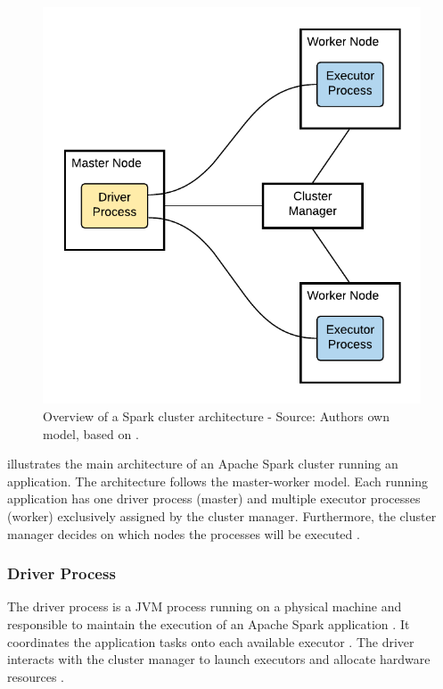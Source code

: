 \begin{figure}[h]
\centering
\includegraphics[scale=1]{images/04_technical_background/spark/spark_cluster_architecture}
\caption{Overview of a Spark cluster architecture - Source: Authors own model, based on \cite{Apache2020Spark}.}
\label{fig:spark_cluster_overview}
\end{figure}

 illustrates the main architecture of an Apache Spark cluster running an application.
The architecture follows the master-worker model.
Each running application has one driver process (master) and multiple executor processes (worker) exclusively assigned by the cluster manager.
Furthermore, the cluster manager decides on which nodes the processes will be executed \cite{Hien2018Spark}.


\subsubsection{Driver Process}
\label{subsubsec:04_spark_architecture_driver}
The driver process is a JVM process running on a physical machine and responsible to maintain the execution of an Apache Spark application \cite{Chambers2018Spark}. It coordinates the application tasks onto each available executor \cite{Hien2018Spark}. 
The driver interacts with the cluster manager to launch executors and allocate hardware resources \cite{Chambers2018Spark, Hien2018Spark}.


